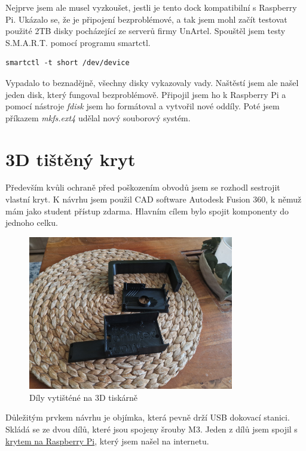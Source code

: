 \documentclass[a4paper,12pt, oneside]{book}
\begin{document}
Nejprve jsem ale musel vyzkoušet, jestli je tento dock kompatibilní 
s Raspberry Pi. Ukázalo se, že je připojení bezproblémové, a tak
jsem mohl začít testovat použité 2TB disky pocházející ze serverů
firmy UnArtel. Spouštěl jsem testy S.M.A.R.T. pomocí programu smartctl.

\begin{lstlisting}
smartctl -t short /dev/device
\end{lstlisting} 

Vypadalo to beznadějně, všechny disky vykazovaly vady. 
Naštěstí jsem ale našel jeden disk, který fungoval bezproblémově.
Připojil jsem ho k Raspberry Pi a pomocí nástroje
\emph{fdisk} jsem ho formátoval a vytvořil nové oddíly.
Poté jsem příkazem \emph{mkfs.ext4} udělal nový souborový systém.




\section{3D tištěný kryt}

Především kvůli ochraně před poškozením obvodů jsem se rozhodl 
sestrojit vlastní kryt. K návrhu jsem použil CAD software 
Autodesk Fusion 360, k němuž mám jako student přístup zdarma.
Hlavním cílem bylo spojit komponenty do jednoho celku.


\begin{figure}[h]
\centering
\includegraphics[width=0.8\textwidth]{img/dily-zvlast.jpg}
\caption{Díly vytišténé na 3D tiskárně}
\end{figure}

Důležitým prvkem návrhu je objímka, která pevně drží USB dokovací stanici.
Skládá se ze dvou dílů, které jsou spojeny šrouby M3. Jeden z dílů jsem
spojil s
\href{https://www.printables.com/model/705427-retro-raspberry-pi-5-case-snap-fit}{krytem
na Raspberry Pi}, který jsem našel na internetu.
\end{document}
